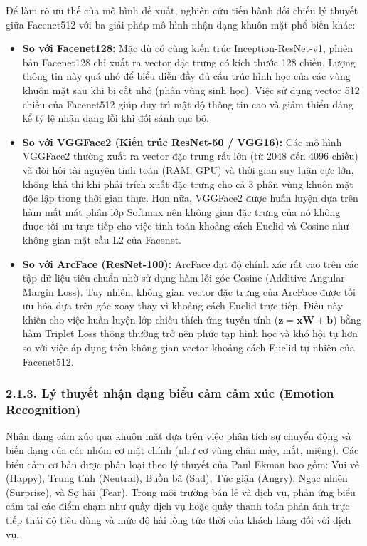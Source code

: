 Để làm rõ ưu thế của mô hình đề xuất, nghiên cứu tiến hành đối chiếu lý thuyết giữa Facenet512 với ba giải pháp mô hình nhận dạng khuôn mặt phổ biến khác:
\begin{itemize}
    \item \textbf{So với Facenet128:} Mặc dù có cùng kiến trúc Inception-ResNet-v1, phiên bản Facenet128 chỉ xuất ra vector đặc trưng có kích thước 128 chiều. Lượng thông tin này quá nhỏ để biểu diễn đầy đủ cấu trúc hình học của các vùng khuôn mặt sau khi bị cắt nhỏ (phân vùng sinh học). Việc sử dụng vector 512 chiều của Facenet512 giúp duy trì mật độ thông tin cao và giảm thiểu đáng kể tỷ lệ nhận dạng lỗi khi đối sánh cục bộ.
    
    \item \textbf{So với VGGFace2 (Kiến trúc ResNet-50 / VGG16):} Các mô hình VGGFace2 thường xuất ra vector đặc trưng rất lớn (từ 2048 đến 4096 chiều) và đòi hỏi tài nguyên tính toán (RAM, GPU) và thời gian suy luận cực lớn, không khả thi khi phải trích xuất đặc trưng cho cả 3 phân vùng khuôn mặt độc lập trong thời gian thực. Hơn nữa, VGGFace2 được huấn luyện dựa trên hàm mất mát phân lớp Softmax nên không gian đặc trưng của nó không được tối ưu trực tiếp cho việc tính toán khoảng cách Euclid và Cosine như không gian mặt cầu L2 của Facenet.
    
    \item \textbf{So với ArcFace (ResNet-100):} ArcFace đạt độ chính xác rất cao trên các tập dữ liệu tiêu chuẩn nhờ sử dụng hàm lỗi góc Cosine (Additive Angular Margin Loss). Tuy nhiên, không gian vector đặc trưng của ArcFace được tối ưu hóa dựa trên góc xoay thay vì khoảng cách Euclid trực tiếp. Điều này khiến cho việc huấn luyện lớp chiếu thích ứng tuyến tính ($\bm{z} = \bm{x}\bm{W} + \bm{b}$) bằng hàm Triplet Loss thông thường trở nên phức tạp hình học và khó hội tụ hơn so với việc áp dụng trên không gian vector khoảng cách Euclid tự nhiên của Facenet512.
\end{itemize}

\subsubsection*{2.1.3. Lý thuyết nhận dạng biểu cảm cảm xúc (Emotion Recognition)}

Nhận dạng cảm xúc qua khuôn mặt dựa trên việc phân tích sự chuyển động và biến dạng của các nhóm cơ mặt chính (như cơ vùng chân mày, mắt, miệng). Các biểu cảm cơ bản được phân loại theo lý thuyết của Paul Ekman bao gồm: Vui vẻ (Happy), Trung tính (Neutral), Buồn bã (Sad), Tức giận (Angry), Ngạc nhiên (Surprise), và Sợ hãi (Fear). Trong môi trường bán lẻ và dịch vụ, phản ứng biểu cảm tại các điểm chạm như quầy dịch vụ hoặc quầy thanh toán phản ánh trực tiếp thái độ tiêu dùng và mức độ hài lòng tức thời của khách hàng đối với dịch vụ.

